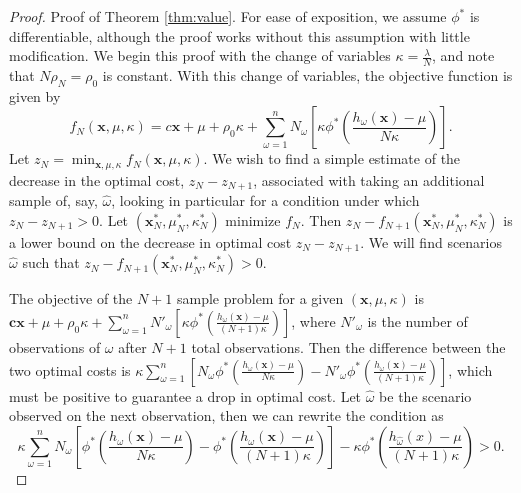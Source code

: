 \documentclass[opre,nonblindrev]{informs3} %
\newcommand{\x}{\mathbf{x}}
\renewcommand{\c}{\mathbf{c}}
\begin{document}
\begin{proof}{\sc Proof of Theorem \ref{thm:value}.}
	For ease of exposition, we assume $\phi^*$ is differentiable, although the proof works without this assumption with little modification.	
	We begin this proof with the change of variables $\kappa = \frac{\lambda}{N}$, and note that $N\rho_N = \rho_0$ is constant.	
	With this change of variables, the objective function is given by
	\[
		f_N(\x,\mu,\kappa) = c\x + \mu + \rho_0 \kappa + \sum_{\omega = 1}^n N_\omega \left[ \kappa \phi^*\left(\frac{h_\omega(\x) - \mu}{N\kappa} \right) \right].
	\]
	Let $z_N = \min_{\x,\mu,\kappa} f_N(\x,\mu,\kappa)$.
	We wish to find a simple estimate of the decrease in the optimal cost, $z_N - z_{N+1}$, associated with taking an additional sample of, say, $\hat{\omega}$, looking in particular for a condition under which $z_N - z_{N+1} > 0$.	
	Let $(\x^*_N,\mu^*_N,\kappa^*_N)$ minimize $f_N$.
	Then $z_N - f_{N+1}(\x^*_N,\mu^*_N,\kappa^*_N)$ is a lower bound on the decrease in optimal cost $z_N - z_{N+1}$.
	We will find scenarios $\hat{\omega}$ such that $z_N - f_{N+1}(\x^*_N,\mu^*_N,\kappa^*_N) > 0$.

	The objective of the $N+1$ sample problem for a given $(\x,\mu,\kappa)$ is $\c\x + \mu + \rho_0 \kappa + \sum_{\omega = 1}^n N'_\omega \left[ \kappa \phi^*\left(\frac{h_\omega(\x) - \mu}{(N+1)\kappa} \right) \right]$,	where $N'_\omega$ is the number of observations of $\omega$ after $N+1$ total observations.
	Then the difference between the two optimal costs is $\kappa \sum_{\omega=1}^n \left[ N_\omega \phi^*\left(\frac{h_\omega(\x) - \mu}{N\kappa} \right) - N'_\omega \phi^*\left(\frac{h_\omega(\x) - \mu}{(N+1)\kappa} \right) \right]$, which must be positive to guarantee a drop in optimal cost.
	Let $\hat{\omega}$ be the scenario observed on the next observation, then we can rewrite the condition as
	\begin{equation} \label{eq:raw_cond}
		\kappa \sum_{\omega=1}^n N_\omega \left[ \phi^*\left(\frac{h_\omega(\x) - \mu}{N\kappa} \right) - \phi^*\left(\frac{h_\omega(\x) - \mu}{(N+1)\kappa} \right) \right] - \kappa \phi^*\left(\frac{h_{\hat{\omega}}(x) - \mu}{(N+1)\kappa}\right) > 0.
	\end{equation}


\end{proof}
\end{document}
